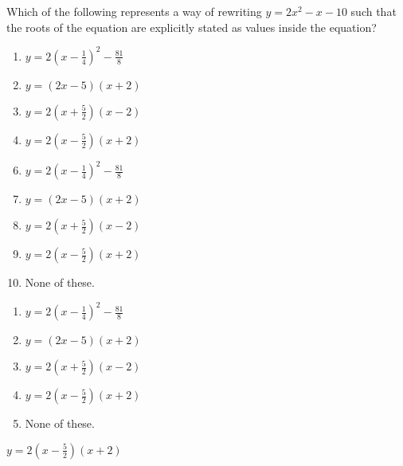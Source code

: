  
Which of the following represents a way of rewriting $y=2x^2-x-10$ such that the roots of the equation are explicitly stated as values inside the equation?


\ifsat
	\begin{enumerate}[label=\Alph*)]
		\item $y=2(x-\frac{1}{4})^2-\frac{81}{8} $ 
		\item $y=(2x-5)(x+2) $ 
		\item $y=2(x+\frac{5}{2})(x-2) $ 
		\item $y=2(x-\frac{5}{2})(x+2) $ %
	\end{enumerate}
\else
\fi

\ifacteven
	\begin{enumerate}[label=\textbf{\Alph*.},itemsep=\fill,align=left]
		\setcounter{enumii}{5}
		\item $y=2(x-\frac{1}{4})^2-\frac{81}{8} $ 
		\item $y=(2x-5)(x+2) $ 
		\item $y=2(x+\frac{5}{2})(x-2) $ 
		\addtocounter{enumii}{1}
		\item $y=2(x-\frac{5}{2})(x+2) $ %
		\item None of these. 
	\end{enumerate}
\else
\fi

\ifactodd
	\begin{enumerate}[label=\textbf{\Alph*.},itemsep=\fill,align=left]
		\item $y=2(x-\frac{1}{4})^2-\frac{81}{8} $ 
		\item $y=(2x-5)(x+2) $ 
		\item $y=2(x+\frac{5}{2})(x-2) $ 
		\item $y=2(x-\frac{5}{2})(x+2) $ %
		\item None of these. 
	\end{enumerate}
\else
\fi

\ifgridin
 $y=2(x-\frac{5}{2})(x+2) $ %

\else
\fi

